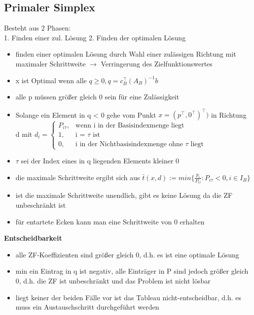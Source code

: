 \documentclass[12pt,a4paper, hyperref]{article}
\begin{document}
\subsection{Primaler Simplex}
Besteht aus 2 Phasen:\\
1. Finden einer zul. Lösung
2. Finden der optimalen Lösung
\begin{itemize}
\item finden einer optimalen Lösung durch Wahl einer zulässigen Richtung mit maximaler Schrittweite $\rightarrow$ Verringerung des Zielfunktionswertes
\item x ist Optimal wenn alle $q \geq 0, q = c^\intercal_B (A_B )^{-1}b$
\item alle p müssen größer gleich 0 sein für eine Zulässigkeit
\item Solange ein Element in q < 0 gehe vom Punkt $x = (p^\intercal ,0^\intercal)^\intercal)$ in Richtung d mit $d_i= \begin{cases}
P_{i\tau}, & \text{wenn i in der Basisindexmenge liegt} \\
1, & \text{i = $\tau$ ist} \\
0, & \text{i in der Nichtbasisindexmenge ohne $\tau$ liegt}
\end{cases}$
\item $\tau$ sei der Index eines in q liegenden Elements kleiner 0
\item die maximale Schrittweite ergibt sich aus $\bar{t}(x, d) := min\{\frac{p_i}{P_{i\tau}}:P_{i\tau}<0, i\in I_B\}$
\item ist die maximale Schrittweite unendlich, gibt es keine Lösung da die ZF unbeschränkt ist
\item für entartete Ecken kann man eine Schrittweite von 0 erhalten
\end{itemize}

\textbf{Entscheidbarkeit}
\begin{itemize}
\item alle ZF-Koeffizienten sind größer gleich 0, d.h. es ist eine optimale Lösung
\item min ein Eintrag in q ist negativ, alle Einträger in P sind jedoch größer gleich 0, d.h. die ZF ist unbeschränkt und das Problem ist nicht lösbar
\item liegt keiner der beiden Fälle vor ist das Tableau nicht-entscheidbar, d.h. es muss ein Austauschschritt durchgeführt werden
\end{itemize}
\end{document}
